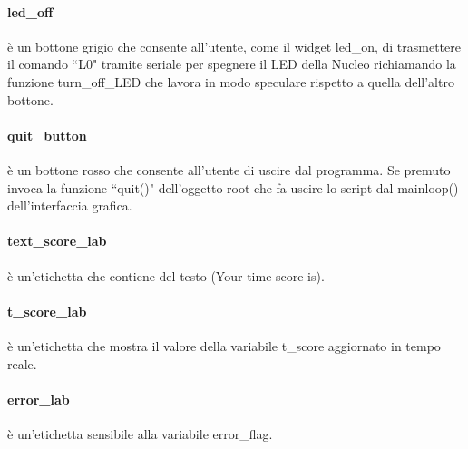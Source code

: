 \documentclass[a4paper]{article}
\begin{document}
\paragraph{led\_off} è un bottone grigio che consente all'utente, come il widget led\_on, di trasmettere il comando ``L0" tramite seriale per spegnere il LED della Nucleo richiamando la funzione turn\_off\_LED che lavora in modo speculare rispetto a quella dell'altro bottone.
\paragraph{quit\_button} è un bottone rosso che consente all'utente di uscire dal programma. Se premuto invoca la funzione ``quit()" dell'oggetto root che fa uscire lo script dal mainloop() dell'interfaccia grafica.
\paragraph{text\_score\_lab} è un'etichetta che contiene del testo (Your time score is).
\paragraph{t\_score\_lab} è un'etichetta che mostra il valore della variabile t\_score aggiornato in tempo reale.
\paragraph{error\_lab} è un'etichetta sensibile alla variabile error\_flag. 
\end{document}
